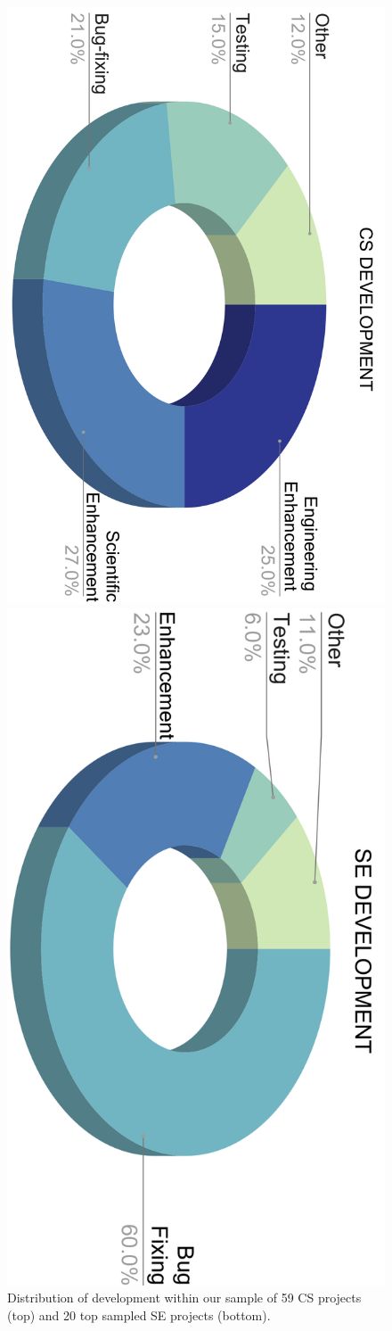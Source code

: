 \documentclass[sigconf,review,anonymous]{acmart}
\begin{document}
\begin{figure}[!b]
\hspace{-3mm}
\begin{center}
\includegraphics[angle=90,width=.45\textwidth]{img/CS_commits.png}

\includegraphics[angle=90,width=.48\textwidth]{img/SE_commits.png}

\end{center}
\caption{Distribution of development within our sample of 59 CS projects (top) and 20 top sampled SE projects (bottom).}
\label{fig:SE_activities}
\end{figure}
\end{document}
